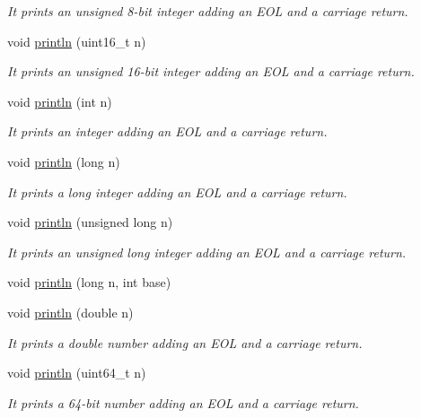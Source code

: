 \begin{DoxyCompactItemize}
\begin{DoxyCompactList}\small\item\em It prints an unsigned 8-\/bit integer adding an E\+OL and a carriage return. \end{DoxyCompactList}\item 
void \hyperlink{class_wasp_u_s_b_aec207e8ffda9adb29bb22cfaf4d789e8}{println} (uint16\+\_\+t n)
\begin{DoxyCompactList}\small\item\em It prints an unsigned 16-\/bit integer adding an E\+OL and a carriage return. \end{DoxyCompactList}\item 
void \hyperlink{class_wasp_u_s_b_af8b8845b2a32b1d346f5173948b72e09}{println} (int n)
\begin{DoxyCompactList}\small\item\em It prints an integer adding an E\+OL and a carriage return. \end{DoxyCompactList}\item 
void \hyperlink{class_wasp_u_s_b_ad18e47947018f4290a6e765ba3929e6a}{println} (long n)
\begin{DoxyCompactList}\small\item\em It prints a long integer adding an E\+OL and a carriage return. \end{DoxyCompactList}\item 
void \hyperlink{class_wasp_u_s_b_adc9c958cf0b4dfed7f0c840a5049df31}{println} (unsigned long n)
\begin{DoxyCompactList}\small\item\em It prints an unsigned long integer adding an E\+OL and a carriage return. \end{DoxyCompactList}\item 
void \hyperlink{class_wasp_u_s_b_a8702439e3b1619b5264f2bcf3f3b73f5}{println} (long n, int base)
\item 
void \hyperlink{class_wasp_u_s_b_af2c8f07a15502d6019c0a656aeb8d473}{println} (double n)
\begin{DoxyCompactList}\small\item\em It prints a double number adding an E\+OL and a carriage return. \end{DoxyCompactList}\item 
void \hyperlink{class_wasp_u_s_b_a7420294baca46c7b8790c0c227229b26}{println} (uint64\+\_\+t n)
\begin{DoxyCompactList}\small\item\em It prints a 64-\/bit number adding an E\+OL and a carriage return. \end{DoxyCompactList}\item 

\end{DoxyCompactItemize}
